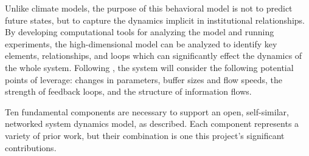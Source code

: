 \documentclass[12pt, oneside]{amsart}
\begin{document}
Unlike climate models, the purpose of this behavioral model is not to predict future states, but to capture the dynamics implicit in institutional relationships.  By developing computational tools for analyzing the model and running experiments, the high-dimensional model can be analyzed to identify key elements, relationships, and loops which can significantly effect the dynamics of the whole system.  Following  \cite{meadows1997places}, the system will consider the following potential points of leverage: changes in parameters, buffer sizes and flow speeds, the strength of feedback loops, and the structure of information flows.

Ten fundamental components are necessary to support an open, self-similar, networked system dynamics model, as described.  Each component represents a variety of prior work, but their combination is one this project's significant contributions.
\end{document}
